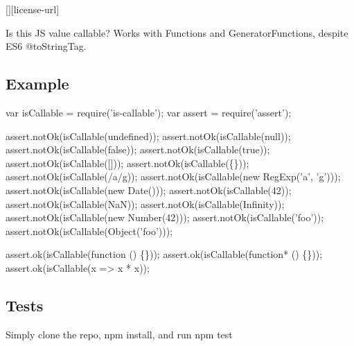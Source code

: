 \href{https://travis-ci.org/ljharb/is-callable}{\tt } \href{https://david-dm.org/ljharb/is-callable}{\tt } \href{https://david-dm.org/ljharb/is-callable#info=devDependencies}{\tt } \mbox{[}\mbox{]}\mbox{[}license-\/url\mbox{]} \href{http://npm-stat.com/charts.html?package=is-callable}{\tt }

\href{https://npmjs.org/package/is-callable}{\tt }

\href{https://ci.testling.com/ljharb/is-callable}{\tt }

Is this JS value callable? Works with Functions and Generator\+Functions, despite E\+S6 @to\+String\+Tag.

\subsection*{Example}


\begin{DoxyCode}
var isCallable = require('is-callable');
var assert = require('assert');

assert.notOk(isCallable(undefined));
assert.notOk(isCallable(null));
assert.notOk(isCallable(false));
assert.notOk(isCallable(true));
assert.notOk(isCallable([]));
assert.notOk(isCallable(\{\}));
assert.notOk(isCallable(/a/g));
assert.notOk(isCallable(new RegExp('a', 'g')));
assert.notOk(isCallable(new Date()));
assert.notOk(isCallable(42));
assert.notOk(isCallable(NaN));
assert.notOk(isCallable(Infinity));
assert.notOk(isCallable(new Number(42)));
assert.notOk(isCallable('foo'));
assert.notOk(isCallable(Object('foo')));

assert.ok(isCallable(function () \{\}));
assert.ok(isCallable(function* () \{\}));
assert.ok(isCallable(x => x * x));
\end{DoxyCode}


\subsection*{Tests}

Simply clone the repo, {\ttfamily npm install}, and run {\ttfamily npm test} 